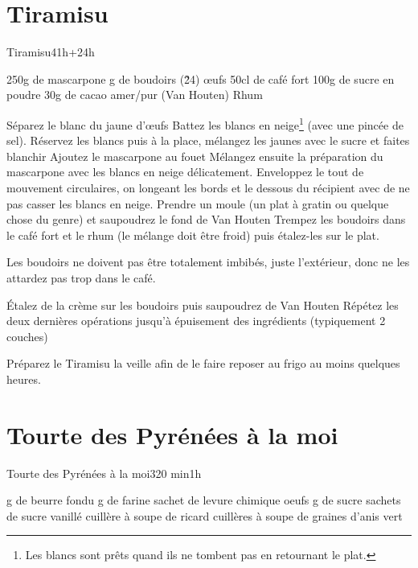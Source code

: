 {\section{Tiramisu}
\begin{recette}{Tiramisu}{4}{1h+24h}{}
\begin{ingredients}
\ingredient 250g de mascarpone
 g de boudoirs (\~ 24)
 œufs
\ingredient 50cl de café fort
\ingredient 100g de sucre en poudre
\ingredient 30g de cacao amer/pur (Van Houten)
\ingredient Rhum
\end{ingredients}

\begin{preparation}
\etape Séparez le blanc du jaune d'œufs
\etape Battez les blancs en neige\footnote{Les 
blancs sont prêts quand ils ne tombent pas en retournant le plat.} (avec une pincée de sel).
\etape Réservez les blancs puis à la place, mélangez les jaunes avec le sucre et faites blanchir
\etape Ajoutez le mascarpone au fouet
\etape Mélangez ensuite la préparation du mascarpone avec les blancs en neige délicatement. Enveloppez le tout de mouvement 
circulaires, on longeant les bords et le dessous du récipient avec de ne pas casser les blancs en neige.
\etape Prendre un moule (un plat à gratin ou quelque chose du genre) et saupoudrez le fond de Van Houten
\etape Trempez les boudoirs dans le café fort et le rhum (le mélange doit être froid) puis étalez-les sur le plat.
\begin{remarque}
Les boudoirs ne doivent pas être totalement imbibés, juste l'extérieur, donc ne les attardez pas trop dans le café.
\end{remarque}
\etape Étalez de la crème sur les boudoirs puis saupoudrez de Van Houten
\etape Répétez les deux dernières opérations jusqu'à épuisement des ingrédients (typiquement 2 couches)
\end{preparation}

\begin{remarque}
Préparez le Tiramisu la veille afin de le faire reposer au frigo au moins quelques heures.
\end{remarque}
\end{recette}

\section{Tourte des Pyrénées à la moi}
\begin{recette}{Tourte des Pyrénées à la moi}{3}{20 min}{1h}
\begin{ingredients}
 g de beurre fondu
 g de farine
 sachet de levure chimique
 oeufs
 g de sucre
 sachets de sucre vanillé
 cuillère à soupe de ricard
 cuillères à soupe de graines d'anis vert
\end{ingredients}


\end{recette}}
